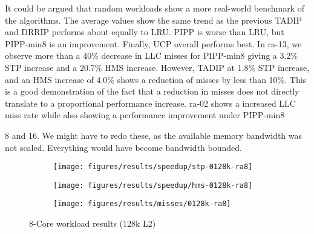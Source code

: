 It could be argued that random workloads show a more real-world benchmark of the algorithms.
The average values show the same trend as the previous TADIP and DRRIP performs about equally to LRU.
PIPP is worse than LRU, but PIPP-min8 is an improvement.
Finally, UCP overall performs best.
In ra-13, we observe more than a 40\% decrease in LLC misses for PIPP-min8 giving a 3.2\% STP increase and a 20.7\% HMS increase.
However, TADIP at 1.8\% STP increase, and an HMS increase of 4.0\% shows a reduction of misses by less than 10\%.
This is a good demonstration of the fact that a reduction in misses does not directly translate to a proportional performance increase. 
ra-02 shows a increased LLC miss rate while also showing a performance improvement under PIPP-min8


8 and 16. We might have to redo these, as the available memory bandwidth was not scaled. Everything would have become bandwidth bounded.





\begin{figure}
    \centering
    \begin{subfigure}[b]{\textwidth}
            \texttt{[image: figures/results/speedup/stp-0128k-ra8]}
            \label{fig:results:4core:hms:random}
    \end{subfigure}

    \begin{subfigure}[b]{\textwidth}
            \texttt{[image: figures/results/speedup/hms-0128k-ra8]}
            \label{fig:results:4core:hms:cache}
    \end{subfigure}
    \begin{subfigure}[b]{\textwidth}
            \texttt{[image: figures/results/misses/0128k-ra8]}
            \label{fig:results:4core:hms:cache-bw}
    \end{subfigure}

    \caption{8-Core workload results (128k L2)}\label{fig:results:4core:hms}
\end{figure}

